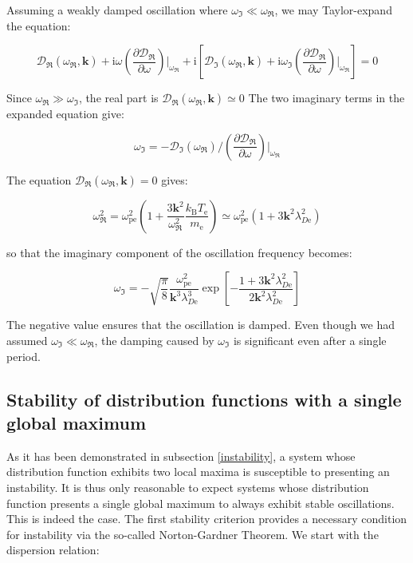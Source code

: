 Assuming a weakly damped oscillation where $\omega_{\Im}\ll\omega_{\Re}{}$, we may Taylor-expand the equation:

\begin{equation}
    \mathcal{D}_{\Re}(\omega_{\Re},\mathbf{k})+\mathrm{i}\omega\left(\frac{\partial\mathcal{D}_{\Re}}{\partial\omega}\right)\Biggr|_{\omega_{\Re}}+\mathrm{i}\left[\mathcal{D}_{\Im}(\omega_{\Re},\mathbf{k})+\mathrm{i}\omega_{\Im}\left(\frac{\partial \mathcal{D}_{\Re}}{\partial\omega}\right)\Biggr|_{\omega_{\Re}}\right]=0
\end{equation}

Since $\omega_{\Re}\gg\omega_{\Im}$, the real part is $\mathcal{D}_{\Re}(\omega_{\Re},\mathbf{k})\simeq0$ The two imaginary terms in the expanded equation give:

\begin{equation}
    \omega_{\Im}=-\mathcal{D}_{\Im}(\omega_{\Re})\biggr/\left(\frac{\partial \mathcal{D}_{\Re}}{\partial\omega}\right)\Biggr|_{\omega_{\Re}}
\end{equation}

The equation $\mathcal{D}_{\Re}(\omega_{\Re},\mathbf{k})=0$ gives:

\begin{equation}
    \omega_{\Re}^2=\omega_\text{pe}^2\left(1+\frac{3\mathbf{k}^2}{\omega_{\Re}^2}\frac{k_\mathrm{B}T_\text{e}}{m_\text{e}}\right)\simeq\omega_\text{pe}^2\left(1+3\mathbf{k}^2\lambda_{D\text{e}}^2\right)
\end{equation}

so that the imaginary component of the oscillation frequency becomes:

\begin{equation}
    \omega_{\Im}=-\sqrt{\frac{\pi}{8}}\frac{\omega_\text{pe}^2}{\mathbf{k}^3\lambda_{D\text{e}}^3}\exp{\left[-\frac{1+3\mathbf{k}^2\lambda_{D\text{e}}^2}{2\mathbf{k}^2\lambda_{D\text{e}}^2}\right]}
\end{equation}

The negative value ensures that the oscillation is damped. Even though we had assumed $\omega_{\Im}\ll\omega_{\Re}$, the damping caused by $\omega_{\Im}$ is significant even after a single period.

\subsection{Stability of distribution functions with a single global maximum}

As it has been demonstrated in subsection \ref{instability}, a system whose distribution function exhibits two local maxima is susceptible to presenting an instability. It is thus only reasonable to expect systems whose distribution function presents a single global maximum to always exhibit stable oscillations. This is indeed the case. The first stability criterion provides a necessary condition for instability via the so-called Norton-Gardner Theorem. We start with the dispersion relation:

